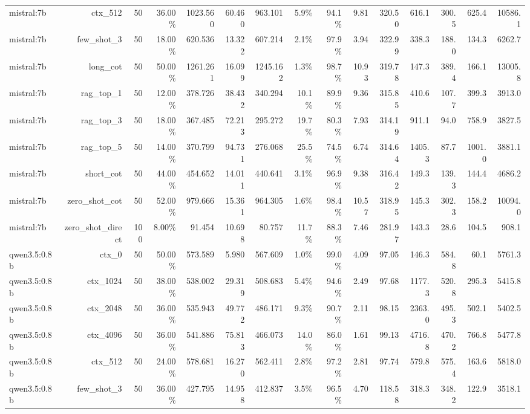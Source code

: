 \begin{table}[t]
\begin{tabular}{lrrrrrrrrrrrrrr}
mistral:7b & ctx\_512 & 50 & 36.00\% & 1023.560 & 60.460 & 963.101 & 5.9\% & 94.1\% & 9.81 & 320.50 & 616.1 & 300.5 & 625.4 & 10586.1 \\
mistral:7b & few\_shot\_3 & 50 & 18.00\% & 620.536 & 13.322 & 607.214 & 2.1\% & 97.9\% & 3.94 & 322.99 & 338.3 & 188.0 & 134.3 & 6262.7 \\
mistral:7b & long\_cot & 50 & 50.00\% & 1261.261 & 16.099 & 1245.162 & 1.3\% & 98.7\% & 10.93 & 319.78 & 147.3 & 389.4 & 166.1 & 13005.8 \\
mistral:7b & rag\_top\_1 & 50 & 12.00\% & 378.726 & 38.432 & 340.294 & 10.1\% & 89.9\% & 9.36 & 315.85 & 410.6 & 107.7 & 399.3 & 3913.0 \\
mistral:7b & rag\_top\_3 & 50 & 18.00\% & 367.485 & 72.213 & 295.272 & 19.7\% & 80.3\% & 7.93 & 314.19 & 911.1 & 94.0 & 758.9 & 3827.5 \\
mistral:7b & rag\_top\_5 & 50 & 14.00\% & 370.799 & 94.731 & 276.068 & 25.5\% & 74.5\% & 6.74 & 314.64 & 1405.3 & 87.7 & 1001.0 & 3881.1 \\
mistral:7b & short\_cot & 50 & 44.00\% & 454.652 & 14.011 & 440.641 & 3.1\% & 96.9\% & 9.38 & 316.42 & 149.3 & 139.3 & 144.4 & 4686.2 \\
mistral:7b & zero\_shot\_cot & 50 & 52.00\% & 979.666 & 15.361 & 964.305 & 1.6\% & 98.4\% & 10.57 & 318.95 & 145.3 & 302.3 & 158.2 & 10094.0 \\
mistral:7b & zero\_shot\_direct & 100 & 8.00\% & 91.454 & 10.698 & 80.757 & 11.7\% & 88.3\% & 7.46 & 281.97 & 143.3 & 28.6 & 104.5 & 908.1 \\
qwen3.5:0.8b & ctx\_0 & 50 & 50.00\% & 573.589 & 5.980 & 567.609 & 1.0\% & 99.0\% & 4.09 & 97.05 & 146.3 & 584.8 & 60.1 & 5761.3 \\
qwen3.5:0.8b & ctx\_1024 & 50 & 38.00\% & 538.002 & 29.319 & 508.683 & 5.4\% & 94.6\% & 2.49 & 97.68 & 1177.3 & 520.8 & 295.3 & 5415.8 \\
qwen3.5:0.8b & ctx\_2048 & 50 & 36.00\% & 535.943 & 49.772 & 486.171 & 9.3\% & 90.7\% & 2.11 & 98.15 & 2363.0 & 495.3 & 502.1 & 5402.5 \\
qwen3.5:0.8b & ctx\_4096 & 50 & 36.00\% & 541.886 & 75.813 & 466.073 & 14.0\% & 86.0\% & 1.61 & 99.13 & 4716.8 & 470.2 & 766.8 & 5477.8 \\
qwen3.5:0.8b & ctx\_512 & 50 & 24.00\% & 578.681 & 16.270 & 562.411 & 2.8\% & 97.2\% & 2.81 & 97.74 & 579.8 & 575.4 & 163.6 & 5818.0 \\
qwen3.5:0.8b & few\_shot\_3 & 50 & 36.00\% & 427.795 & 14.958 & 412.837 & 3.5\% & 96.5\% & 4.70 & 118.58 & 318.3 & 348.2 & 122.9 & 3518.1 \\

\end{tabular}
\end{table}

